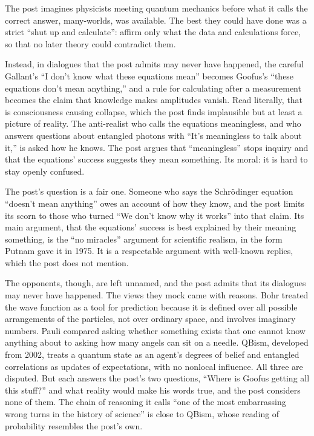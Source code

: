 \begin{afterword}
\summaryhead

The post imagines physicists meeting quantum mechanics before what it calls the correct answer, many-worlds, was available. The best they could have done was a strict ``shut up and calculate'': affirm only what the data and calculations force, so that no later theory could contradict them.

Instead, in dialogues that the post admits may never have happened, the careful Gallant's ``I don't know what these equations mean'' becomes Goofus's ``these equations don't mean anything,'' and a rule for calculating after a measurement becomes the claim that knowledge makes amplitudes vanish. Read literally, that is consciousness causing collapse, which the post finds implausible but at least a picture of reality. The anti-realist who calls the equations meaningless, and who answers questions about entangled photons with ``It's meaningless to talk about it,'' is asked how he knows. The post argues that ``meaningless'' stops inquiry and that the equations' success suggests they mean something. Its moral: it is hard to stay openly confused.

\responsehead

The post's question is a fair one. Someone who says the Schrödinger equation ``doesn't mean anything'' owes an account of how they know, and the post limits its scorn to those who turned ``We don't know why it works'' into that claim. Its main argument, that the equations' success is best explained by their meaning something, is the ``no miracles'' argument for scientific realism, in the form Putnam gave it in 1975. It is a respectable argument with well-known replies, which the post does not mention.

The opponents, though, are left unnamed, and the post admits that its dialogues may never have happened. The views they mock came with reasons. Bohr treated the wave function as a tool for prediction because it is defined over all possible arrangements of the particles, not over ordinary space, and involves imaginary numbers. Pauli compared asking whether something exists that one cannot know anything about to asking how many angels can sit on a needle. QBism, developed from 2002, treats a quantum state as an agent's degrees of belief and entangled correlations as updates of expectations, with no nonlocal influence. All three are disputed. But each answers the post's two questions, ``Where is Goofus getting all this stuff?'' and what reality would make his words true, and the post considers none of them. The chain of reasoning it calls ``one of the most embarrassing wrong turns in the history of science'' is close to QBism, whose reading of probability resembles the post's own.


\end{afterword}
